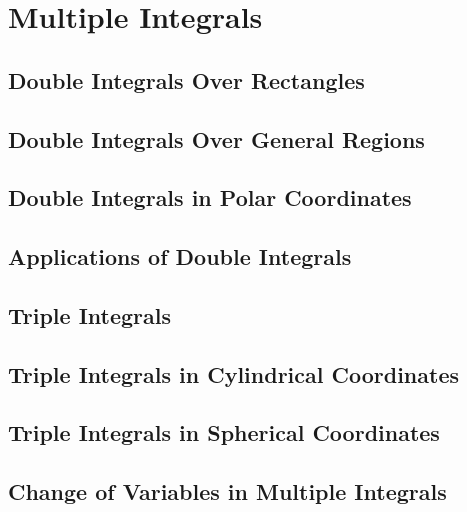 \setcounter{chapter}{11}
\chapter{Multiple Integrals}
    \section{Double Integrals Over Rectangles}
    \section{Double Integrals Over General Regions}
    \section{Double Integrals in Polar Coordinates}
    \section{Applications of Double Integrals}
    \section{Triple Integrals}
    \section{Triple Integrals in Cylindrical Coordinates}
    \section{Triple Integrals in Spherical Coordinates}
    \section{Change of Variables in Multiple Integrals}